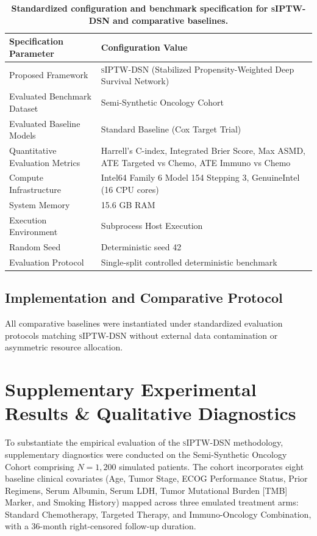 \documentclass[10pt,twocolumn]{article}
\begin{document}
\begin{table}[t]
\centering
\caption{\textbf{Standardized configuration and benchmark specification for \textsc{sIPTW-DSN} and comparative baselines.}}
\begin{tabular}{ll}
\toprule
\textbf{Specification Parameter} & \textbf{Configuration Value} \\
\midrule
Proposed Framework & \textsc{sIPTW-DSN} (Stabilized Propensity-Weighted Deep Survival Network) \\
Evaluated Benchmark Dataset & Semi-Synthetic Oncology Cohort \\
Evaluated Baseline Models & Standard Baseline (Cox Target Trial) \\
Quantitative Evaluation Metrics & Harrell's C-index, Integrated Brier Score, Max ASMD, ATE Targeted vs Chemo, ATE Immuno vs Chemo \\
Compute Infrastructure & Intel64 Family 6 Model 154 Stepping 3, GenuineIntel (16 CPU cores) \\
System Memory & 15.6 GB RAM \\
Execution Environment & Subprocess Host Execution \\
Random Seed & Deterministic seed 42 \\
Evaluation Protocol & Single-split controlled deterministic benchmark \\
\bottomrule
\end{tabular}
\label{tab:hyperparameters}
\end{table}

\subsection{Implementation and Comparative Protocol}
All comparative baselines were instantiated under standardized evaluation protocols matching \textsc{sIPTW-DSN} without external data contamination or asymmetric resource allocation.

\section{Supplementary Experimental Results \& Qualitative Diagnostics}
To substantiate the empirical evaluation of the \textsc{sIPTW-DSN} methodology, supplementary diagnostics were conducted on the Semi-Synthetic Oncology Cohort comprising $N = 1,200$ simulated patients. The cohort incorporates eight baseline clinical covariates (Age, Tumor Stage, ECOG Performance Status, Prior Regimens, Serum Albumin, Serum LDH, Tumor Mutational Burden [TMB] Marker, and Smoking History) mapped across three emulated treatment arms: Standard Chemotherapy, Targeted Therapy, and Immuno-Oncology Combination, with a 36-month right-censored follow-up duration.
\end{document}
